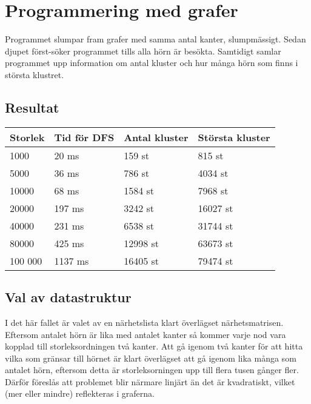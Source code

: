 \documentclass[a4paper,10pt,twoside]{article}
\begin{document}
\section {Programmering med grafer}

Programmet slumpar fram grafer med samma antal kanter, slumpmässigt. Sedan djupet först-söker programmet tills alla hörn är besökta. Samtidigt samlar programmet upp information om antal kluster och hur många hörn som finns i största klustret.

\subsection {Resultat}

\begin{tabular}{llll} %
Storlek	&	Tid för DFS	&	Antal kluster	&	Största kluster	\\
\hline %
1000	&	20 ms	&	159 st	&	815 st	\\
5000	&	36 ms	&	786 st	&	4034 st \\
10000	&	68 ms	&	1584 st &	7968 st	\\
20000	&	197 ms	&	3242 st	&	16027 st	\\
40000	&	231 ms	&	6538 st &	31744 st	\\
80000	&	425 ms	&	12998 st	&	63673 st	\\
100 000	&	1137 ms	&	16405 st	&	79474 st	\\
\end{tabular}

\subsection{Val av datastruktur}

I det här fallet är valet av en närhetslista klart överlägset närhetsmatrisen. Eftersom antalet hörn är lika med antalet kanter så kommer varje nod vara kopplad till storleksordningen två kanter. Att gå igenom två kanter för att hitta vilka som gränsar till hörnet är klart överlägset att gå igenom lika många som antalet hörn, eftersom detta är storleksorningen upp till flera tusen gånger fler. Därför föreslås att problemet blir närmare linjärt än det är kvadratiskt, vilket (mer eller mindre) reflekteras i graferna.

\clearpage

\appendix
\end{document}
